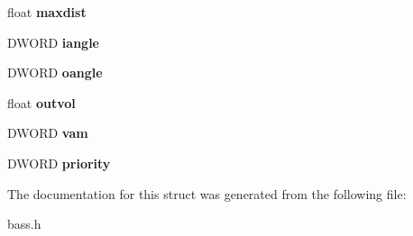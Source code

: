 \begin{DoxyCompactItemize}
\item 
float {\bfseries maxdist}\label{struct_b_a_s_s___s_a_m_p_l_e_a3e3c1c0fc99110afd6b7cebbcab1ad35}

\item 
D\+W\+O\+R\+D {\bfseries iangle}\label{struct_b_a_s_s___s_a_m_p_l_e_a680ef402d0a1a1f934f35aa3eb74c746}

\item 
D\+W\+O\+R\+D {\bfseries oangle}\label{struct_b_a_s_s___s_a_m_p_l_e_a6fac12da5e3308d9122f0f8c9e7eb181}

\item 
float {\bfseries outvol}\label{struct_b_a_s_s___s_a_m_p_l_e_a8c280d4cfbc49970503b931c9e8fa4dc}

\item 
D\+W\+O\+R\+D {\bfseries vam}\label{struct_b_a_s_s___s_a_m_p_l_e_af6bf250cbb800dfff363da346074e301}

\item 
D\+W\+O\+R\+D {\bfseries priority}\label{struct_b_a_s_s___s_a_m_p_l_e_a99f47aeb64df3819f1c419a94a911a24}

\end{DoxyCompactItemize}


The documentation for this struct was generated from the following file\+:\begin{DoxyCompactItemize}
\item 
bass.\+h\end{DoxyCompactItemize}

